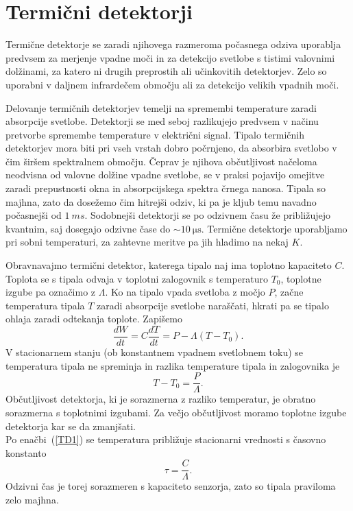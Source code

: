 \section{Termični detektorji}
Termične detektorje se zaradi njihovega razmeroma počasnega odziva uporablja predvsem 
za merjenje vpadne moči in za detekcijo svetlobe s tistimi valovnimi dolžinami, za katero 
ni drugih preprostih ali učinkovitih detektorjev. Zelo so uporabni v daljnem
infrardečem območju ali za detekcijo velikih vpadnih moči.

Delovanje termičnih detektorjev temelji na spremembi temperature zaradi absorpcije svetlobe. 
Detektorji se med seboj razlikujejo predvsem v načinu pretvorbe spremembe 
temperature v električni signal.
Tipalo termičnih detektorjev mora biti pri vseh vrstah dobro počrnjeno, da absorbira
svetlobo v čim širšem spektralnem območju. Čeprav je njihova občutljivost načeloma 
neodvisna od valovne dolžine vpadne svetlobe, se v praksi pojavijo omejitve zaradi
prepustnosti okna in absorpcijskega spektra črnega nanosa. Tipala so majhna, zato 
da dosežemo čim hitrejši odziv, ki pa je kljub temu navadno počasnejši od $1~\si{ms}$. 
Sodobnejši detektorji se po odzivnem času že približujejo 
kvantnim, saj dosegajo odzivne čase do $\sim 10~\si{\micro\second}$. 
Termične detektorje uporabljamo pri sobni temperaturi,  
za zahtevne meritve pa jih hladimo na nekaj $\si{K}$. 

Obravnavajmo termični detektor, katerega tipalo naj ima toplotno kapaciteto $C$. Toplota
se s tipala odvaja v toplotni zalogovnik s temperaturo $T_0$, 
toplotne izgube pa označimo z $\Lambda$. Ko na tipalo vpada svetloba z močjo $P$, 
začne temperatura tipala $T$ zaradi absorpcije svetlobe naraščati, hkrati pa se tipalo 
ohlaja zaradi odtekanja toplote. Zapišemo
\begin{equation}
\frac{dW}{dt} = C \frac{dT}{dt} = P - \Lambda (T-T_0).
\label{TD1}
\end{equation}
V stacionarnem stanju (ob konstantnem vpadnem svetlobnem toku) se
temperatura tipala ne spreminja in razlika temperature tipala in zalogovnika je 
\begin{equation}
T - T_0 = \frac{P}{\Lambda}.
\label{temp_sens}
\end{equation}
Občutljivost detektorja, ki je sorazmerna z razliko temperatur, 
je obratno sorazmerna s toplotnimi izgubami. Za večjo občutljivost moramo
toplotne izgube detektorja kar se da zmanjšati. \\
Po enačbi~(\ref{TD1}) se temperatura približuje stacionarni vrednosti s časovno konstanto 
\begin{equation}
\tau = \frac{C}{\Lambda}.
\label{TermD_t}
\end{equation}
Odzivni čas je torej sorazmeren s kapaciteto senzorja, zato so tipala praviloma 
zelo majhna.

